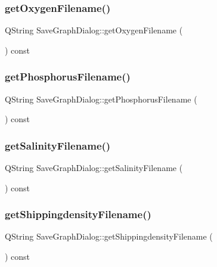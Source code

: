 \subsubsection{\texorpdfstring{getOxygenFilename()}{getOxygenFilename()}}
{\footnotesize\ttfamily Q\+String Save\+Graph\+Dialog\+::get\+Oxygen\+Filename (\begin{DoxyParamCaption}{ }\end{DoxyParamCaption}) const}

\mbox{\label{class_save_graph_dialog_ae989c632ffd5335ef6cdce0cb9dc25fb}} 
\subsubsection{\texorpdfstring{getPhosphorusFilename()}{getPhosphorusFilename()}}
{\footnotesize\ttfamily Q\+String Save\+Graph\+Dialog\+::get\+Phosphorus\+Filename (\begin{DoxyParamCaption}{ }\end{DoxyParamCaption}) const}

\mbox{\label{class_save_graph_dialog_af918b728fc74d5e9cea206bf25d38399}} 
\subsubsection{\texorpdfstring{getSalinityFilename()}{getSalinityFilename()}}
{\footnotesize\ttfamily Q\+String Save\+Graph\+Dialog\+::get\+Salinity\+Filename (\begin{DoxyParamCaption}{ }\end{DoxyParamCaption}) const}

\mbox{\label{class_save_graph_dialog_a94de085d1a87a549e95d0ce05b08ba8c}} 
\subsubsection{\texorpdfstring{getShippingdensityFilename()}{getShippingdensityFilename()}}
{\footnotesize\ttfamily Q\+String Save\+Graph\+Dialog\+::get\+Shippingdensity\+Filename (\begin{DoxyParamCaption}{ }\end{DoxyParamCaption}) const}

